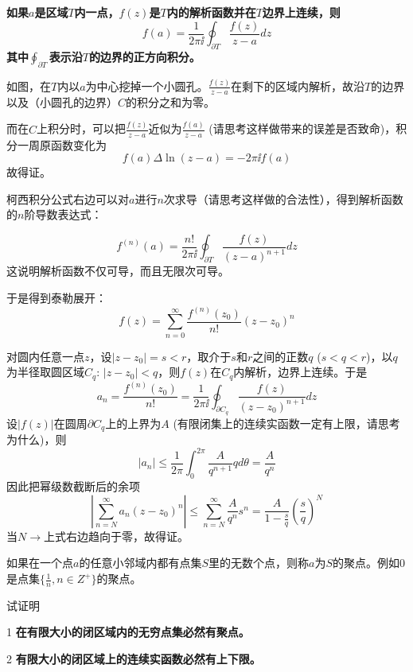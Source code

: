 \documentclass[CJK]{beamer}
\begin{document}
\begin{frame}
  \bch
      {\bf \blue 如果$a$是区域$T$内一点，$f(z)$是$T$内的解析函数并在$T$边界上连续，则
        $$ f(a) = \frac{1}{2\pi \ii}\oint_{\partial T} \frac{f(z)}{z-a} dz $$
        其中$\oint_{\partial T}$表示沿$T$的边界的正方向积分。}

      \emini
      如图，在$T$内以$a$为中心挖掉一个小圆孔。$\frac{f(z)}{z-a}$在剩下的区域内解析，故沿$T$的边界以及（小圆孔的边界）$C$的积分之和为零。

      而在$C$上积分时，可以把$\frac{f(z)}{z-a}$近似为$\frac{f(a)}{z-a}$ (请思考这样做带来的误差是否致命)，积分一周原函数变化为
      $$f(a)\Delta\ln(z-a)  = -2\pi \ii f(a)$$
      故得证。
      \emini
  \ech
\end{frame}

\begin{frame}
  \bch
  柯西积分公式右边可以对$a$进行$n$次求导（请思考这样做的合法性），得到解析函数的$n$阶导数表达式：

  {\blue
        $$f^{(n)}(a) = \frac{n!}{2\pi \ii}\oint_{\partial T} \frac{f(z)}{(z-a)^{n+1}} dz$$    
  }
  这说明解析函数不仅可导，而且无限次可导。

  于是得到泰勒展开：
  $$f(z) = \sum_{n=0}^\infty \frac{f^{(n)}(z_0)}{n!} (z-z_0)^n$$
  \ech
\end{frame}


\begin{frame}
  \bch
 对圆内任意一点$z$，设$|z-z_0|=s<r$，取介于$s$和$r$之间的正数$q$ ($s<q<r$)，以$q$为半径取圆区域$C_q$: $|z-z_0|<q$，则$f(z)$在$C_q$内解析，边界上连续。于是
  $$ a_n = \frac{f^{(n)}(z_0)}{n!} = \frac{1}{2\pi \ii}\oint_{\partial C_q} \frac{f(z)}{(z-z_0)^{n+1}}dz $$
  设$|f(z)|$在圆周$\partial C_q$上的上界为$A$ (有限闭集上的连续实函数一定有上限，请思考为什么)，则
  $$ |a_n| \le \frac{1}{2\pi} \int_0^{2\pi} \frac{A}{q^{n+1}} qd\theta = \frac{A}{q^n} $$
  因此把幂级数截断后的余项
  $$ \left\vert \sum_{n=N}^\infty a_n (z-z_0)^n \right\vert \le \sum_{n=N}^\infty \frac{A}{q^n}s^n =\frac{A}{1-\frac{s}{q}} \left(\frac{s}{q}\right)^N$$
  当$N\rightarrow$上式右边趋向于零，故得证。
  \ech
\end{frame}


\begin{frame}
  \bch
  如果在一个点$a$的任意小邻域内都有点集$S$里的无数个点，则称$a$为$S$的聚点。例如$0$是点集$\{ \frac{1}{n}, n\in Z^+\}$的聚点。


  试证明
  \bitem
\item[1]{\bf 在有限大小的闭区域内的无穷点集必然有聚点。}
\item[2]{\bf 有限大小的闭区域上的连续实函数必然有上下限。}
  \eitem
  \ech
\end{frame}
\end{document}
